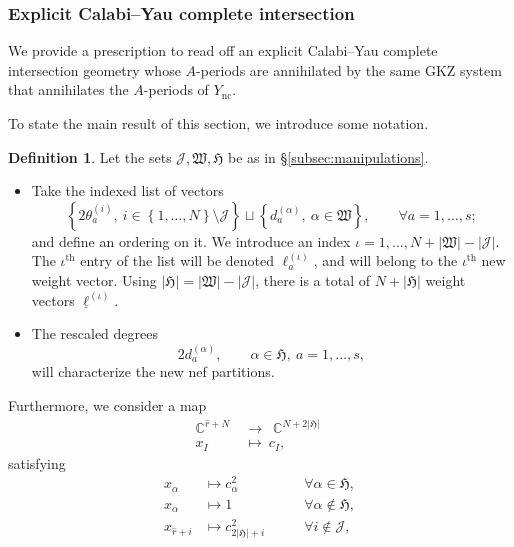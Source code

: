 \documentclass[12pt,a4paper,oneside]{amsart}
\numberwithin{equation}{section}
\theoremstyle{definition}
\newtheorem{defin}[thm]{Definition}
\theoremstyle{remark}
\DeclareMathOperator{\C}{\mathbb{C}}
\newcommand{\Ync}{Y_{\mathrm{nc}}}
\begin{document}
\subsubsection{Explicit Calabi--Yau complete intersection} We provide a prescription to read off an explicit Calabi--Yau complete intersection geometry whose $A$-periods are annihilated by the same GKZ system that annihilates the $A$-periods of $\Ync$.\par
To state the main result of this section, we introduce some notation.
\begin{defin}\label{notation:Xsc}
    Let the sets $\mathcal{J}, \mathfrak{W}, \mathfrak{H}$ be as in \S\ref{subsec:manipulations}. 
    \begin{itemize}
        \item Take the indexed list of vectors
            \begin{equation}
            \label{eq:weightXgen}
    		  \left\{ 2\theta_a^{(i)} , \ i \in \left\{ 1, \dots , N \right\} \setminus \mathcal{J} \right\} \sqcup \left\{  d_a^{(\alpha)} , \ \alpha \in \mathfrak{W} \right\} , \qquad \forall a=1, \dots, s  ;
	        \end{equation}
            and define an ordering on it. We introduce an index $\iota =1, \dots, N + \lvert \mathfrak{W} \rvert - \lvert \mathcal{J} \rvert$. The $\iota^{\text{th}}$ entry of the list will be denoted $\ell_a ^{(\iota)}$, and will belong to the $\iota^{\text{th}}$ new weight vector. Using $\lvert \mathfrak{H}\rvert =\lvert \mathfrak{W}\rvert - \lvert \mathcal{J} \rvert $, there is a total of $N+\lvert \mathfrak{H}\rvert$ weight vectors $\underline{\ell}^{(\iota)}$.
        \item The rescaled degrees 
            \begin{equation}
            \label{eq:degreeXgen}
	   	       2d_a^{(\alpha)} ,  \qquad \alpha \in \mathfrak{H} , \ a=1, \dots, s ,
	        \end{equation}
            will characterize the new nef partitions.
    \end{itemize}
\end{defin}
Furthermore, we consider a map
\begin{equation*}
\begin{aligned}
    \C^{\hat{r}+N} \ & \to \ \C^{N+2 \lvert \mathfrak{H}\rvert} \\
    x_I \ & \mapsto \ c_I ,
\end{aligned}
\end{equation*}
satisfying 
\begin{equation}
\label{eq:xImapstocI}
\begin{aligned}
    x_{\alpha} & \mapsto c_{\alpha}^2 \qquad & \forall \alpha \in \mathfrak{H} , \\
    x_{\alpha} & \mapsto 1 \qquad & \forall \alpha \notin \mathfrak{H} , \\
    x_{\hat{r}+i} & \mapsto c_{2 \lvert \mathfrak{H}\rvert +i } ^2 \qquad & \forall i \notin \mathcal{J} ,
\end{aligned}
\end{equation}
\end{document}
